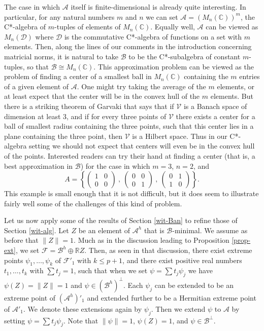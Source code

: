 \documentclass[12pt]{amsart}
\newcommand{\<}{\langle}
\renewcommand{\>}{\rangle}
\newcommand{\cA}{{\mathcal A}}
\newcommand{\cB}{{\mathcal B}}
\newcommand{\cD}{{\mathcal D}}
\newcommand{\cF}{{\mathcal F}}
\newcommand{\cV}{{\mathcal V}}
\newcommand{\cAo}{{\mathcal A}'_1}
\newcommand{\cFo}{{\mathcal F}'_1}
\newcommand{\cAH}{{\mathcal A}^h}
\newcommand{\cBH}{{\mathcal B}^h}
\newcommand{\bR}{{\mathbb R}}
\newcommand{\bC}{{\mathbb C}}
\theoremstyle{definition}   %
\begin{document}
The case in which $\cA$ itself is finite-dimensional is already quite
interesting. In particular, for any natural numbers $m$ and $n$ we
can set $\cA = (M_n(\bC))^m$, the C*-algebra of $m$-tuples of
 elements of $M_n(\bC)$. Equally well, $\cA$ can be viewed 
 as $M_n(\cD)$ where $\cD$ is the commutative C*-algebra of 
 functions on a set with $m$ elements. Then, along the lines
 of our comments in the introduction concerning matricial
 norms, it is natural to take $\cB$ to be the C*-subalgebra of
constant $m$-tuples, so that $\cB \cong M_n(\bC)$.
This approximation problem 
can be viewed as the problem of finding a center of a smallest
ball in $M_n(\bC)$ containing the $m$ entries of a
given element of $\cA$.
One might try taking the average of the $m$ elements, or at least
expect that the center will be in the convex hull of the $m$ elements.
But there is a striking theorem of Garvaki \cite{Grv} that says that if 
$\cV$ is a Banach space of dimension at least 3, and if for every three 
points of $\cV$ there exists a center for a ball of smallest radius 
containing the three points, such that this center lies in a plane 
containing the three point, then $\cV$ is a Hilbert space. Thus in
our C*-algebra setting we should not expect that centers will even 
be in the convex hull of the points. Interested readers can try their
hand at finding a center (that is, a best approximation in $\cB$)
for the case in which $m=3$, $n=2$, and
\[
A = \left\{ \begin{pmatrix}  1 & 0 \\
                                          0 & 0       \end{pmatrix}     \ , \ 
               \begin{pmatrix}  0 & 0  \\
                                         0 & 1             \end{pmatrix}     \ , \
              \begin{pmatrix}   0 & 1  \\                                              
                                         1 & 0             \end{pmatrix}     
     \right\}  .         
\]     
This example is small enough that it is not difficult, but it does seem
to illustrate fairly well some of the challenges of this kind of problem.

Let us now apply some of the results of Section \ref{wit-Ban} to
refine those of Section \ref{wit-alg}. Let $Z$ be an element of
$\cAH$ that is $\cB$-minimal.  We assume
as before that $\|Z\| = 1$. Much as in the discussion leading to Proposition
\ref{prop-ext}, we set $\cF = \cBH \oplus \bR Z$. Then, as seen in that
discussion, there exist extreme points
$\psi_1, \dots, \psi_k$ of $\cFo$ with $k \leq p+1$, and there exist
positive real numbers $t_1, \dots, t_k$ with $\sum t_j = 1$,
such that when we set $\psi = \sum t_j\psi_j$ we have $\psi(Z) = \|Z\| = 1$
and $\psi \in (\cBH)^\perp$. 
Each $\psi_j$ can be extended to be
an extreme point of $(\cAH)'_1$ and extended further to be a
Hermitian extreme point of $\cAo$. We denote these extensions again by
$\psi_j$. Then we extend $\psi$ to $\cA$ by setting 
$\psi = \sum t_j\psi_j$. Note that $\|\psi\| = 1$,  $\psi(Z) = 1$, and 
$\psi \in \cB^\perp$. 
\end{document}
